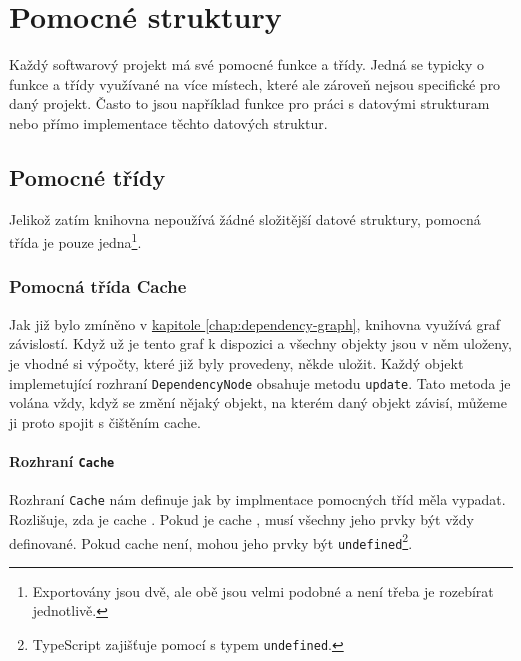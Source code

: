 \chapter{Pomocné struktury}
\label{chap:helpers}

Každý softwarový projekt má své pomocné funkce a třídy. 
Jedná se typicky o funkce a třídy využívané na více místech, které ale zároveň nejsou specifické pro daný projekt.
Často to jsou například funkce pro práci s datovými strukturam nebo přímo implementace těchto datových struktur.

\section{Pomocné třídy}
\label{sec:helper-classes}

Jelikož zatím knihovna nepoužívá žádné složitější datové struktury, pomocná třída je pouze jedna\footnote{Exportovány jsou dvě, ale obě jsou velmi podobné a není třeba je rozebírat jednotlivě.}.

\subsection[Cache]{Pomocná třída Cache}
\label{subsec:helper-class-cache}

Jak již bylo zmíněno v \hyperref[chap:dependency-graph]{kapitole \ref*{chap:dependency-graph}}, knihovna využívá graf závislostí.
Když už je tento graf k dispozici a všechny objekty jsou v něm uloženy, je vhodné si výpočty, které již byly provedeny, někde uložit.
Každý objekt implemetující rozhraní \texttt{DependencyNode} obsahuje metodu \texttt{update}\cite[line 26]{geometryjs:source:interfaces:dependencyNode.ts}.
Tato metoda je volána vždy, když se změní nějaký objekt, na kterém daný objekt závisí, můžeme ji proto spojit s čištěním cache.

\subsubsection[Rozhraní]{Rozhraní \texttt{Cache}}
\label{subsubsec:helper-class-cache-interface}

Rozhraní \texttt{Cache}\cite{geometryjs:source:interfaces:cache.ts} nám definuje jak by implmentace pomocných tříd měla vypadat.
Rozlišuje, zda je cache .
Pokud je cache , musí všechny jeho prvky být vždy definované.
Pokud cache  není, mohou jeho prvky být \texttt{undefined}\footnote{TypeScript zajišťuje  pomocí  s typem \texttt{undefined}.}.

